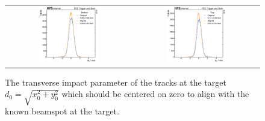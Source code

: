\begin{figure}
  \centering
  \begin{tabular}{cc}
    \includegraphics[width=0.49\textwidth]{figures/hps/alignment/d0_bottom.pdf}
    &
    \includegraphics[width=0.49\textwidth]{figures/hps/alignment/d0_top.pdf}
  \end{tabular}
  \caption{The transverse impact parameter of the tracks at the target
  $d_0 = \sqrt{x_0^2+y_0^2}$ which should be centered on zero to align with
  the known beamspot at the target.}
  \label{fig:example-align-d0}
\end{figure}

